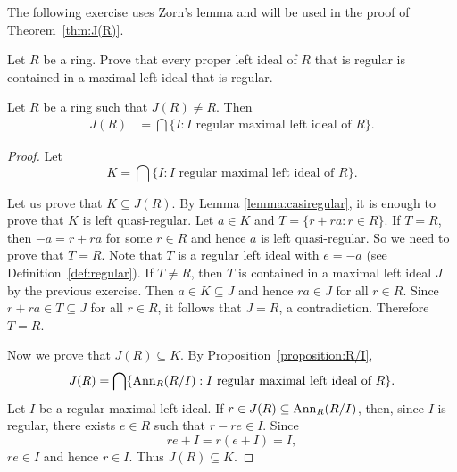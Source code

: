 %

The following exercise uses Zorn's lemma 
and will be used in the proof of Theorem~\ref{thm:J(R)}. 

\begin{exercise}
\label{xca:regular}
    Let $R$ be a ring. 
    Prove that every proper left ideal of $R$ that 
    is regular is contained in a maximal left ideal that is regular. 
\end{exercise}

\begin{theorem}
	\label{thm:J(R)}
	Let $R$ be a ring such that $J(R)\ne R$. Then 
	\begin{align*}
		J(R)&=\bigcap\{I:\text{$I$ regular maximal left ideal of $R$}\}.
	\end{align*}
\end{theorem}

\begin{proof}
        Let 
	\[
	K=\bigcap\{I:\text{$I$ regular maximal left ideal of $R$}\}.
	\]
        
        Let us prove that $K\subseteq J(R)$. By Lemma \ref{lemma:casiregular}, 
        it is enough to prove that $K$ is left quasi-regular. 
        Let $a\in K$ and $T=\{r+ra:r\in R\}$. 
        If $T=R$, then $-a=r+ra$ for some $r\in R$ and hence 
        $a$ is left quasi-regular. So we need to prove that $T=R$. Note that 
        $T$ is a regular left ideal with $e=-a$ (see Definition~\ref{def:regular}). If $T\ne R$, then $T$ is contained in a maximal left ideal $J$  
        by the previous exercise. Then 
        $a\in K\subseteq J$ and hence $ra\in J$ for all $r\in R$. Since 
        $r+ra\in T\subseteq J$ for all $r\in R$, it follows that $J=R$, a contradiction. Therefore $T=R$. 
        
        Now we prove that $J(R)\subseteq K$. 
		By
	Proposition~\ref{proposition:R/I}, 
	\[
		J(R)=\bigcap\{\operatorname{Ann}_R(R/I):I\text{ regular maximal left ideal of $R$}\}.
	\]
	Let $I$ be a regular maximal left ideal. If $r\in J(R)\subseteq
	\operatorname{Ann}_R(R/I)$, then, since $I$ is regular, there exists $e\in R$ such that
	$r-re\in I$. Since 
	\[
	re+I=r(e+I)=I,
	\]
	$re\in I$ and hence $r\in I$. Thus $J(R)\subseteq K$. 
\end{proof}

